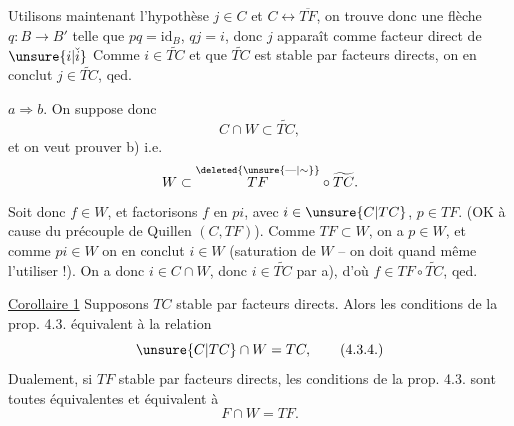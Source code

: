 Utilisons maintenant l'hypothèse $j\in C$ et $C\longleftrightarrow\overline{TF}$, on trouve donc  une flèche $q:B\longrightarrow B'$ telle que $pq=\mathrm{id}_B$, $qj=i$, donc $j$ apparaît comme facteur direct de $\unsure{i|\check{i}}$ Comme $i\in\widetilde{TC}$ et que $\widetilde{TC}$ est stable par facteurs directs, on en conclut $j\in\widetilde{TC}$, qed.

$a\Longrightarrow b$. On suppose donc
\[
C\cap W\subset\widetilde{TC},
\]
et on veut prouver b) i.e.
\[
W\subset\overset{\deleted{\unsure{\text{---}|\sim}}}{TF}\circ\widetilde{TC}.
\]
Soit donc $f\in W$, et factorisons $f$ en $pi$, avec $i\in\unsure{C|TC}$, $p\in TF$. (OK à cause du précouple de Quillen $(C,TF)$). Comme $TF\subset W$, on a $p\in W$, et comme $pi\in W$ on en conclut $i\in W$ (saturation  de $W$ -- on doit quand même l'utiliser !). On a donc $i\in C\cap W$, donc $i\in\widetilde{TC}$ par a), d'où $f\in TF\circ\widetilde{TC}$, qed.

\uline{Corollaire 1} Supposons $TC$ stable par facteurs directs.
Alors  les conditions de la prop. 4.3.  équivalent à la relation
\[
\unsure{C|TC}\cap W=TC,
\tag*{(4.3.4.)}
\]
Dualement, si $TF$ stable par facteurs directs, les conditions de la prop. 4.3. sont toutes équivalentes et équivalent à
\[
F\cap W=TF.
\tag*{(4.3.4')}
\]
